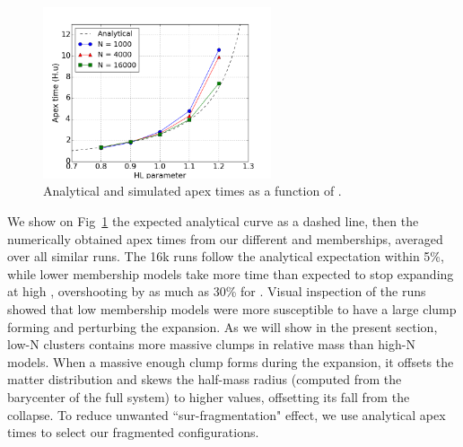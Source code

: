 \begin{figure}
\begin{center}
\includegraphics[width=0.6\textwidth]{Figures/2_apextime_NH.png}
\end{center}
\caption[Analytical and simulated apex times as a function of \tHub]{Analytical and simulated apex times as a function of \tHub.}
\label{Fig:2_apextime_NH}
\end{figure} 

We show on Fig~\ref{Fig:2_apextime_NH} the expected analytical curve as a dashed line, then the numerically obtained apex times from our different \tHub and memberships, averaged over all similar runs. The 16k runs follow the analytical expectation within 5\%, while lower membership models take more time than expected to stop expanding at high \tHub, overshooting by as much as 30\% for . Visual inspection of the runs showed that low membership models were more susceptible to have a  large clump forming and perturbing the expansion. As we will show in the present section, low-N clusters contains more massive clumps in relative mass than high-N models. When a massive enough clump forms during the expansion, it offsets the matter distribution and skews the half-mass radius (computed from the barycenter of the full system) to higher values, offsetting its fall from the collapse. To reduce unwanted ``sur-fragmentation" effect, we use analytical apex times to select our fragmented configurations.  


